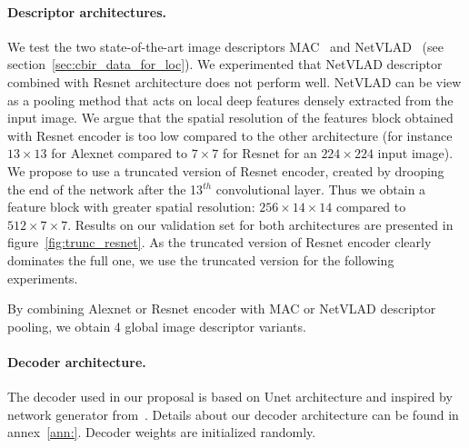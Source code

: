 \paragraph{Descriptor architectures.}

We test the two state-of-the-art image descriptors MAC~\citep{Razavian2014a} and NetVLAD~\citep{Arandjelovic2017} (see section~\ref{sec:cbir_data_for_loc}). We experimented that NetVLAD descriptor combined with Resnet architecture does not perform well. NetVLAD can be view as a pooling method that acts on local deep features densely extracted from the input image. We argue that the spatial resolution of the features block obtained with Resnet encoder is too low compared to the other architecture (for instance $13\times13$ for Alexnet compared to $7\times7$ for Resnet for an $224\times224$ input image). We propose to use a truncated version of Resnet encoder, created by drooping the end of the network after the 13$^{th}$ convolutional layer. Thus we obtain a feature block with greater spatial resolution: $256\times14\times14$ compared to $512\times7\times7$. Results on our validation set for both architectures are presented in figure~\ref{fig:trunc_resnet}. As the truncated version of Resnet encoder clearly dominates the full one, we use the truncated version for the following experiments.

By combining Alexnet or Resnet encoder with MAC or NetVLAD descriptor pooling, we obtain 4 global image descriptor variants.

\paragraph{Decoder architecture.}
The decoder used in our proposal is based on Unet architecture and inspired by network generator from~\cite{Isola2017}. Details about our decoder architecture can be found in annex~\ref{ann:}. Decoder weights are initialized randomly.

